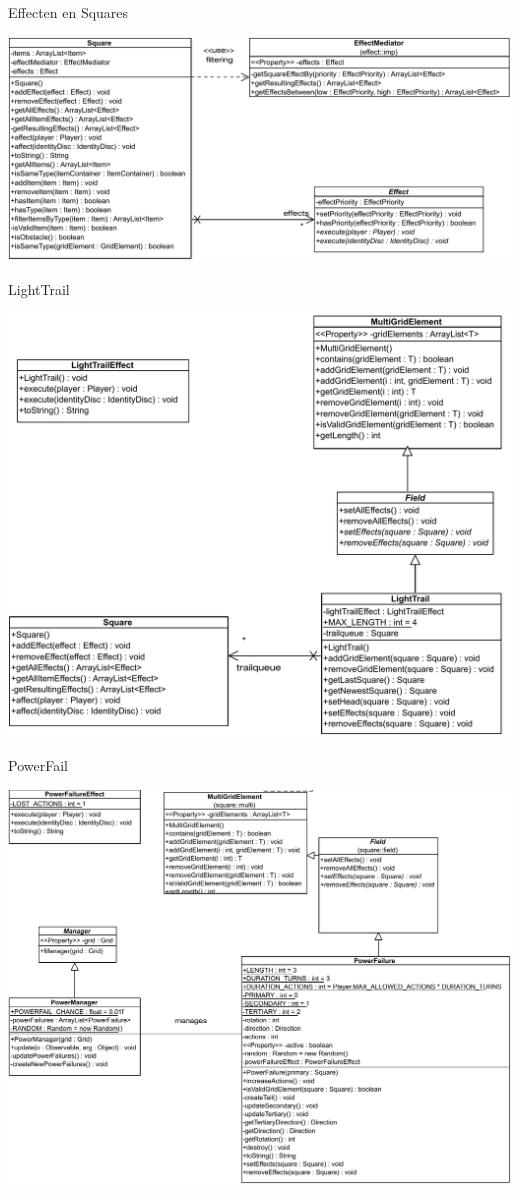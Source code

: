 \documentclass[11pt,t]{beamer}
\begin{document}
\begin{frame}{Effecten en Squares}
\vspace{0.2in}
\begin{center}
\includegraphics[width=0.9\linewidth]{images/squareeffect}
\end{center}
\end{frame}


\begin{frame}{LightTrail}
\begin{center}
\includegraphics[width=0.6\linewidth]{images/lighttrail}
\end{center}
\end{frame}

\begin{frame}{PowerFail}
\begin{center}
\includegraphics[width=0.7\linewidth]{images/powerfailure}
\end{center}
\end{frame}
\end{document}
